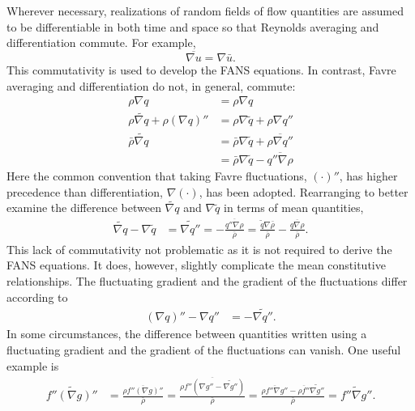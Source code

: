 \documentclass[letterpaper,11pt,nointlimits,reqno,draft]{amsbook}
\begin{document}
Wherever necessary, realizations of random fields of flow quantities
are assumed to be differentiable in both time and space so that Reynolds
averaging and differentiation commute.  For example,
%
\begin{equation*}
\overline{ \nabla{}u } = \nabla\bar{u}.
\end{equation*}
%
This commutativity is used to develop the FANS equations.  In contrast, Favre
averaging and differentiation do not, in general, commute:
\begin{align}
  \rho \nabla q &= \rho \nabla q
\\
   \rho \widetilde{\nabla{}q} + \rho \left(\nabla{}q\right)''
&=
   \rho \nabla \tilde{q} + \rho \nabla{}q''
\\
     \bar{\rho} \widetilde{\nabla{}q}
&=
     \bar{\rho} \nabla{\tilde{q}}
   + \overline{\rho \nabla{}q''}
\\
&=
     \bar{\rho} \nabla{\tilde{q}}
   - \overline{q''\nabla\rho}
\end{align}
Here the common convention that taking Favre fluctuations,
$\left(\cdot\right)''$, has higher precedence than differentiation,
$\nabla\left(\cdot\right)$, has been adopted.  Rearranging to better examine
the difference between $\widetilde{\nabla{}q}$ and $\nabla\tilde{q}$ in terms
of mean quantities,
\begin{align}
  \label{eq:favremeancommute}
  \widetilde{\nabla{}q}
  -
  \nabla{\tilde{q}}
&=
  \widetilde{\nabla{}q''}
= - \frac{{\overline{q''\nabla\rho}}}{\bar{\rho}}
= \frac{\tilde{q}\nabla\bar{\rho}}{\bar{\rho}}
  - \frac{\overline{q\nabla\rho}}{\bar{\rho}}
.
\end{align}
This lack of commutativity not problematic as it is not required to derive the
FANS equations.  It does, however, slightly complicate the mean constitutive
relationships.  The fluctuating gradient and the gradient of the fluctuations
differ according to
\begin{align}
  \label{eq:favrefluctcommute}
  \left(\nabla{}q\right)'' - \nabla{}q'' &= - \widetilde{\nabla{}q''}
.
\end{align}
In some circumstances, the difference between quantities written using a
fluctuating gradient and the gradient of the fluctuations can vanish.
One useful example is
\begin{align}
  \label{eq:favrefluctexample}
\widetilde{f''\left(\nabla{}g\right)''}
&=
\frac{\overline{\rho{}f''\left(\nabla{}g\right)''}}
     {\bar{\rho}}
=
\frac{  \overline{\rho{}f''\left(\nabla{}g''
      - \widetilde{\nabla{}g''}\right)}}
     {\bar{\rho}}
=
\frac{  \overline{\rho{}f''\nabla{}g''}
      - \overline{\rho{}f''}\widetilde{\nabla{}g''}}
     {\bar{\rho}}
=
\widetilde{f''\nabla{}g''}
.
\end{align}
\end{document}
